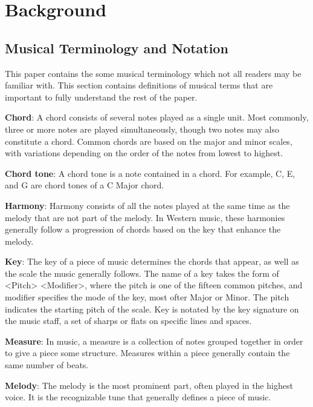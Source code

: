 \chapter{Background} \label{bg}


\section{Musical Terminology and Notation} \label{bg:musicTerminology}

This paper contains the some musical terminology which not all readers may be familiar with.
This section contains definitions of musical terms that are important to fully understand the rest of the paper.

\textbf{Chord}: A chord consists of several notes played as a single unit.
Most commonly, three or more notes are played simultaneously, though two notes may also constitute a chord.
Common chords are based on the major and minor scales, with variations depending on the order of the notes from lowest to highest.

\textbf{Chord tone}: A chord tone is a note contained in a chord.
For example, C, E, and G are chord tones of a C Major chord.

\textbf{Harmony}: Harmony consists of all the notes played at the same time as the melody that are not part of the melody.
In Western music, these harmonies generally follow a progression of chords based on the key that enhance the melody.

\textbf{Key}: The key of a piece of music determines the chords that appear, as well as the scale the music generally follows.
The name of a key takes the form of <Pitch> <Modifier>, where the pitch is one of the fifteen common pitches, and modifier specifies the mode of the key, most ofter Major or Minor.
The pitch indicates the starting pitch of the scale.
Key is notated by the key signature on the music staff, a set of sharps or flats on specific lines and spaces.

\textbf{Measure}: In music, a measure is a collection of notes grouped together in order to give a piece some structure.
Measures within a piece generally contain the same number of beats.

\textbf{Melody}: The melody is the most prominent part, often played in the highest voice.
It is the recognizable tune that generally defines a piece of music.

